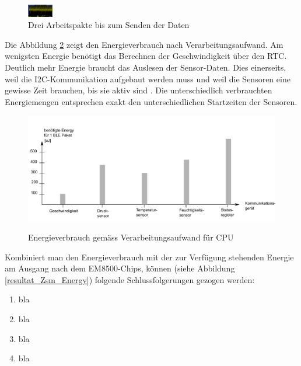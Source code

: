 \begin{figure}[ht]
    \includegraphics[width=0.1\textwidth]{4Resultate/imag/SpannungVCC.png} 
    \caption{Drei Arbeitspakte bis zum Senden der Daten }
    \label{blub}
\end{figure}


Die Abbildung \ref{resultat_E_Verbrauch_Verarbeitungsaufwand} zeigt den Energieverbrauch nach Verarbeitungsaufwand. Am wenigsten Energie benötigt das Berechnen der Geschwindigkeit über den RTC. Deutlich mehr Energie braucht das Auslesen der Sensor-Daten. Dies einerseits, weil die I2C-Kommunikation aufgebaut werden muss und weil die Sensoren eine gewisse Zeit brauchen, bis sie aktiv sind . Die unterschiedlich verbrauchten Energiemengen entsprechen exakt den unterschiedlichen Startzeiten der Sensoren. 

\begin{figure}[ht]
\includegraphics[width=1\textwidth]{4Resultate/imag/EnergyVerbrauchNachKommunikation.png} \label{resultat_E_Verbrauch_Verarbeitungsaufwand} 
\caption{Energieverbrauch gemäss Verarbeitungsaufwand für CPU}
\end{figure}

Kombiniert man den Energieverbrauch mit der zur Verfügung stehenden Energie am Ausgang nach dem EM8500-Chips, können (siehe Abbildung \ref{resultat_Zsm_Energy}) folgende Schlussfolgerungen gezogen werden:

\begin{enumerate}
    \item bla
    \item bla
    \item bla
    \item bla
\end{enumerate}


